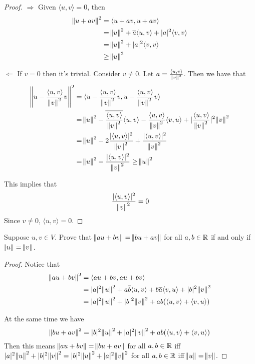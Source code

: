 \documentclass{extarticle}
\begin{document}
\begin{proof}

\(\Rightarrow\) Given \(\langle u,v \rangle = 0\), then 
\begin{align*}
    \norm{u + av}^2 
    &= \langle u + av, u + av \rangle \\ 
    &= \norm{u}^2 + \overline{a}\langle u,v \rangle + |a|^2 \langle v,v \rangle \\ 
    &= \norm{u}^2 + |a|^2 \langle v,v \rangle \\ 
    &\geq \norm{u}^2
\end{align*}

\(\Leftarrow\) If \(v = 0\) then it's trivial. Consider \(v \neq 0\). Let \(a = \frac{\langle u,v \rangle}{\norm{v}^2}\). 
Then we have that 
\begin{align*}
    \norm{u - \frac{\langle u,v \rangle}{\norm{v}^2}v}^2 
    &= \langle u - \frac{\langle u,v \rangle}{\norm{v}^2}v, u - \frac{\langle u,v \rangle}{\norm{v}^2}v \rangle \\ 
    &= \norm{u}^2 - \overline{\frac{\langle u,v \rangle}{\norm{v}^2}} \langle u, v \rangle 
    - \frac{\langle u,v \rangle}{\norm{v}^2} \langle v,u \rangle + 
    \lvert \frac{\langle u,v \rangle}{\norm{v}^2}\rvert^2 \norm{v}^2 \\ 
    &= \norm{u}^2 - 2\frac{|\langle u,v \rangle|^2}{\norm{v}^2} + \frac{|\langle u,v \rangle|^2}{\norm{v}^2} \\ 
    &= \norm{u}^2 - \frac{|\langle u,v \rangle|^2}{\norm{v}^2} \geq \norm{u}^2
\end{align*}

This implies that 
\[\frac{|\langle u,v \rangle|^2}{\norm{v}^2} = 0\]
Since \(v \neq 0\), \(\langle u,v \rangle = 0\).

\end{proof}


\begin{problem}{7}
    Suppose \(u, v \in V\). Prove that \(\norm{au + bv} = \norm{bu + av}\) for all  
    \(a, b \in \mathbb{R}\) if and only if \(\norm{u} = \norm{v}\). 
\end{problem}

\begin{proof}
Notice that 
\begin{align*}
    \norm{au + bv}^2 
    &= \langle au + bv, au+bv \rangle \\ 
    &= |a|^2 \norm{u}^2 + a\overline{b}\langle u,v \rangle 
    + b\overline{a}\langle v,u \rangle + |b|^2 \norm{v}^2  \\ 
    &=|a|^2 \norm{u}^2 + |b|^2 \norm{v}^2 + ab(\langle u,v \rangle + \langle v,u \rangle)
\end{align*}


At the same time we have 
\[\norm{bu + av}^2 = |b|^2 \norm{u}^2 + |a|^2 \norm{v}^2 + ab(\langle u,v \rangle + \langle v,u \rangle)\]
Then this means \(\norm{au + bv} = \norm{bu + av}\) for all  
\(a, b \in \mathbb{R}\) iff \(|a|^2 \norm{u}^2 + |b|^2 \norm{v}^2 = |b|^2 \norm{u}^2 + |a|^2 \norm{v}^2 \) 
for all \(a, b \in \mathbb{R}\) iff \(\norm{u} = \norm{v}\). 
\end{proof}
\end{document}
